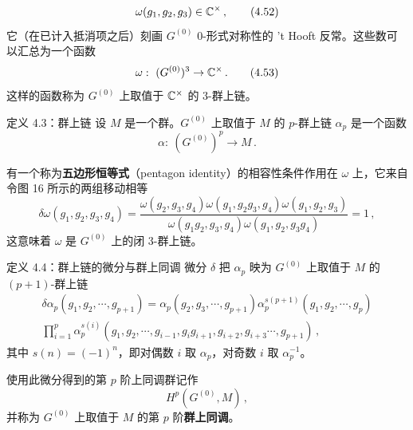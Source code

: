 \begin{equation}
  \omega(g_1,g_2,g_3)\in\mathbb{C}^\times\,, \tag{4.52}
\end{equation}
它（在已计入抵消项之后）刻画 $G^{(0)}$ 0-形式对称性的 't Hooft 反常。这些数可以汇总为一个函数
\begin{equation}
  \omega:\ (G^{(0)})^3\to\mathbb{C}^\times\,. \tag{4.53}
\end{equation}
这样的函数称为 $G^{(0)}$ 上取值于 $\mathbb{C}^\times$ 的 3-群上链。

\begin{definitionbox}{定义 4.3：群上链}
设 $M$ 是一个群。$G^{(0)}$ 上取值于 $M$ 的 $p$-群上链 $\alpha_p$ 是一个函数
\begin{equation}
  \alpha:\ (G^{(0)})^p\to M\,. \tag{4.54}
\end{equation}
\end{definitionbox}

有一个称为\textbf{五边形恒等式}（pentagon identity）的相容性条件作用在 $\omega$ 上，它来自令图 16 所示的两组移动相等
\begin{equation}
  \delta\omega(g_1,g_2,g_3,g_4)=\frac{\omega(g_2,g_3,g_4)\omega(g_1,g_2g_3,g_4)\omega(g_1,g_2,g_3)}{\omega(g_1g_2,g_3,g_4)\omega(g_1,g_2,g_3g_4)}=1\,, \tag{4.55}
\end{equation}
这意味着 $\omega$ 是 $G^{(0)}$ 上的闭 3-群上链。

\begin{definitionbox}{定义 4.4：群上链的微分与群上同调}
微分 $\delta$ 把 $\alpha_p$ 映为 $G^{(0)}$ 上取值于 $M$ 的 $(p+1)$-群上链
\begin{equation}
\begin{gathered}
  \delta\alpha_p(g_1,g_2,\cdots,g_{p+1})=\alpha_p(g_2,g_3,\cdots,g_{p+1})\alpha_p^{s(p+1)}(g_1,g_2,\cdots,g_p)\\
  \prod_{i=1}^{p}\alpha_p^{s(i)}(g_1,g_2,\cdots,g_{i-1},g_ig_{i+1},g_{i+2},g_{i+3}\cdots,g_{p+1})\,,
\end{gathered}
\tag{4.56}
\end{equation}
其中 $s(n)=(-1)^n$，即对偶数 $i$ 取 $\alpha_p$，对奇数 $i$ 取 $\alpha_p^{-1}$。

使用此微分得到的第 $p$ 阶上同调群记作
\begin{equation}
  H^p(G^{(0)},M)\,, \tag{4.57}
\end{equation}
并称为 $G^{(0)}$ 上取值于 $M$ 的第 $p$ 阶\textbf{群上同调}。
\end{definitionbox}


